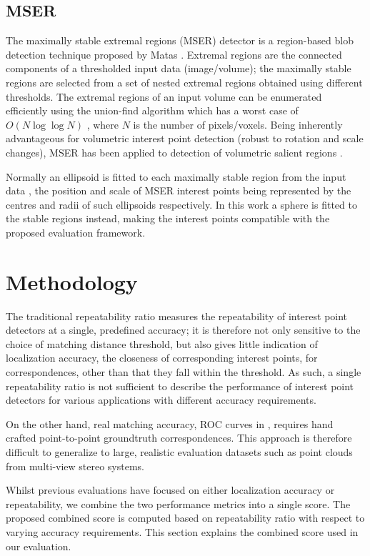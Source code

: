 \subsection{MSER}
The maximally stable extremal regions (MSER) detector is a region-based blob detection technique proposed by Matas \etal \cite{Matas2004}. Extremal regions are the connected components of a thresholded input data (image/volume); the maximally stable regions are selected from a set of nested extremal regions obtained using different thresholds. The extremal regions of an input volume can be enumerated efficiently using the union-find algorithm which has a worst case of $O(N\log\log N)$ \cite{Matas2004}, where $N$ is the number of pixels/voxels. Being inherently advantageous for volumetric interest point detection (\eg robust to rotation and scale changes), MSER has been applied to detection of volumetric salient regions \cite{Donoser2006,Riemenschneider2009}.

Normally an ellipsoid is fitted to each maximally stable region from the input data \cite{Matas2004}, the position and scale of MSER interest points being represented by the centres and radii of such ellipsoids respectively. In this work a sphere is fitted to the stable regions instead, making the interest points compatible with the proposed evaluation framework.


\section{Methodology}
\label{sec/eval/methodology}

The traditional repeatability ratio measures the repeatability of interest point detectors at a single, predefined accuracy; it is therefore not only sensitive to the choice of matching distance threshold, but also gives little indication of localization accuracy, \ie the closeness of corresponding interest points, for correspondences, other than that they fall within the threshold. As such, a single repeatability ratio is not sufficient to describe the performance of interest point detectors for various applications with different accuracy requirements. 

On the other hand, real matching accuracy, \eg ROC curves in \cite{Bowyer1999}, requires hand crafted point-to-point groundtruth correspondences. This approach is therefore difficult to generalize to large, realistic evaluation datasets such as point clouds from multi-view stereo systems.   

Whilst previous evaluations have focused on either localization accuracy or repeatability, we combine the two performance metrics into a single score. The proposed combined score is computed based on repeatability ratio with respect to varying accuracy requirements. This section explains the combined score used in our evaluation.   

